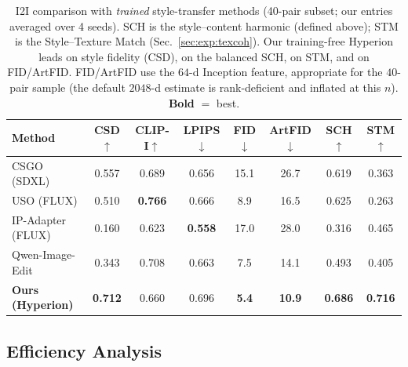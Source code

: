 \begin{table}[t]
  \centering
  \caption{I2I comparison with \emph{trained} style-transfer methods (40-pair
    subset; our entries averaged over 4 seeds). SCH is the style--content
    harmonic (defined above); STM is the Style--Texture
    Match (Sec.~\ref{sec:exp:texcoh}). Our training-free Hyperion leads on style
    fidelity (CSD), on the balanced SCH, on STM, and on FID/ArtFID. FID/ArtFID
    use the $64$-d Inception feature, appropriate for the $40$-pair sample
    (the default $2048$-d estimate is rank-deficient and inflated at this $n$).
    \textbf{Bold} $=$ best.}
  \label{tab:i2i_ext}
  \footnotesize
  \begin{tabular}{lccccccc}
    \toprule
    Method & CSD$\uparrow$ & CLIP-I$\uparrow$ & LPIPS$\downarrow$ & FID$\downarrow$ & ArtFID$\downarrow$ & SCH$\uparrow$ & STM$\uparrow$ \\
    \midrule
    CSGO (SDXL)        & 0.557 & 0.689 & 0.656 & 15.1 & 26.7 & 0.619 & 0.363 \\
    USO (FLUX)         & 0.510 & \textbf{0.766} & 0.666 & 8.9 & 16.5 & 0.625 & 0.263 \\
    IP-Adapter (FLUX)  & 0.160 & 0.623 & \textbf{0.558} & 17.0 & 28.0 & 0.316 & 0.465 \\
    Qwen-Image-Edit    & 0.343 & 0.708 & 0.663 & 7.5 & 14.1 & 0.493 & 0.405 \\
    \rowcolor{tabshade!10}
    \textbf{Ours (Hyperion)} & \textbf{0.712} & 0.660 & 0.696 & \textbf{5.4} & \textbf{10.9} & \textbf{0.686} & \textbf{0.716} \\
    \bottomrule
  \end{tabular}
\end{table}


\subsection{Efficiency Analysis}
\label{sec:exp:efficiency}

